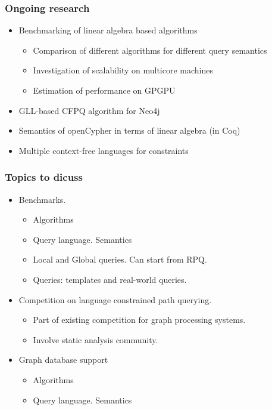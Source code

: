 \documentclass[xcolor=table,aspectratio=169]{beamer}
\begin{document}
\begin{frame}[fragile]

  \frametitle{Ongoing research}
\begin{itemize}
      \item[\faGears] Benchmarking of linear algebra based algorithms
      \begin{itemize}
        \item Comparison of different algorithms for different query semantics
        \item Investigation of scalability on multicore machines
        \item Estimation of performance on GPGPU
      \end{itemize}
      \item[\faGears] GLL-based CFPQ algorithm for Neo4j
      \pause
      \item[\faHourglassHalf] Semantics of openCypher in terms of linear algebra (in Coq)
      \item[\faHourglassHalf] Multiple context-free languages for constraints      
\end{itemize}
\end{frame}

\begin{frame}[fragile]
  \frametitle{Topics to dicuss}
  \begin{itemize}
    \item Benchmarks. 
    \begin{itemize}
      \item Algorithms
      \item Query language. Semantics 
      \item Local and Global queries. Can start from RPQ.
      \item Queries: templates and real-world queries.
    \end{itemize}
    \item Competition on language constrained path querying.   
    \begin{itemize}
      \item Part of existing competition for graph processing systems.
      \item Involve static analysis community. 
    \end{itemize}
    \item Graph database support
    \begin{itemize}
      \item Algorithms
      \item Query language. Semantics 
    \end{itemize}
  \end{itemize}
\end{frame}
\end{document}
